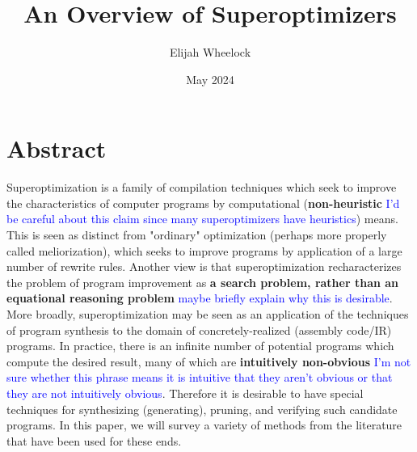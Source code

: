 \documentclass[12pt,twoside]{reedthesis}
\title{An Overview of Superoptimizers}
\author{Elijah Wheelock}
\date{May 2024}
\newcommand{\comment}[2]{\textbf{#1} \textcolor{blue}{#2}}
\begin{document}
\maketitle
\frontmatter %
\pagestyle{empty} %
\tableofcontents

\chapter*{Abstract} %

Superoptimization is a family of compilation techniques which seek to improve the characteristics of computer programs by computational (\comment{non-heuristic}{I'd be careful about this claim since many superoptimizers have heuristics}) means.
This is seen as distinct from "ordinary" optimization (perhaps more properly called meliorization), which seeks to improve programs by application of a large number of rewrite rules.
Another view is that superoptimization recharacterizes the problem of program improvement as \comment{a search problem, rather than an equational reasoning problem}{maybe briefly explain why this is desirable}.
More broadly, superoptimization may be seen as an application of the techniques of program synthesis to the domain of concretely-realized (assembly code/IR) programs.
In practice, there is an infinite number of potential programs which compute the desired result, many of which are \comment{intuitively non-obvious}{I'm not sure whether this phrase means it is intuitive that they aren't obvious or that they are not intuitively obvious}.
Therefore it is desirable to have special techniques for synthesizing (generating), pruning, and verifying such candidate programs. 
In this paper, we will survey a variety of methods from the literature that have been used for these ends.

\mainmatter %
\pagestyle{fancyplain} %
\end{document}
